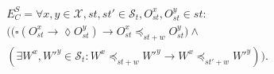 \documentclass[conference]{IEEEtran}
\begin{document}
	\begin{align}\label{eqn:PC}
	\begin{split}
	E^S_C =  \forall x,y \in \mathcal{X}, \mathit{st},\mathit{st}' \in \mathcal{S}_t, O_\mathit{st}^x, O_\mathit{st}^{y} \in \mathit{st}:  \\
	\big( \big( \square \left( O_\mathit{st}^x \rightarrow \lozenge O_\mathit{st}^{y} \right)
	\rightarrow O_\mathit{st}^x \preccurlyeq_{\mathit{st}+w} O_\mathit{st}^{y} \big) \wedge \\
	\left( \exists W^x, W'^{y} \in \mathcal{S}_t: W^x \preccurlyeq_{\mathit{st}+w} W'^{y} \rightarrow W^x \preccurlyeq_{\mathit{st'}+w} W'^{y} \right) \big).
	\end{split}
	\end{align}
\end{document}
